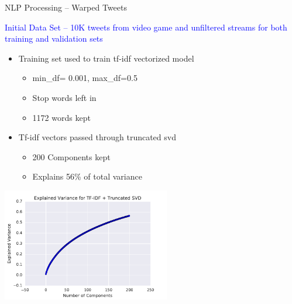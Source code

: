 \documentclass[aspectratio=1610]{beamer}
\begin{document}
\begin{frame}{NLP Processing -- Warped Tweets}
  \begin{center}
    \textcolor{blue}{Initial Data Set -- 10K tweets from video game
      and unfiltered streams for both  training and validation sets}
  \end{center}

  \begin{multicols}{2}
  \begin{itemize}
  \item Training set used to train tf-idf vectorized model
    \begin{itemize}
    \item min\_df= 0.001, max\_df=0.5
    \item Stop words left in
    \item 1172 words kept
    \end{itemize}
  \item Tf-idf vectors passed through truncated svd
    \begin{itemize}
    \item 200 Components kept
    \item Explains 56\% of total variance
    \end{itemize}
  \end{itemize}

  \includegraphics[width=0.55\textwidth]{variation.pdf}
  \end{multicols}

 
\end{frame}
\end{document}
